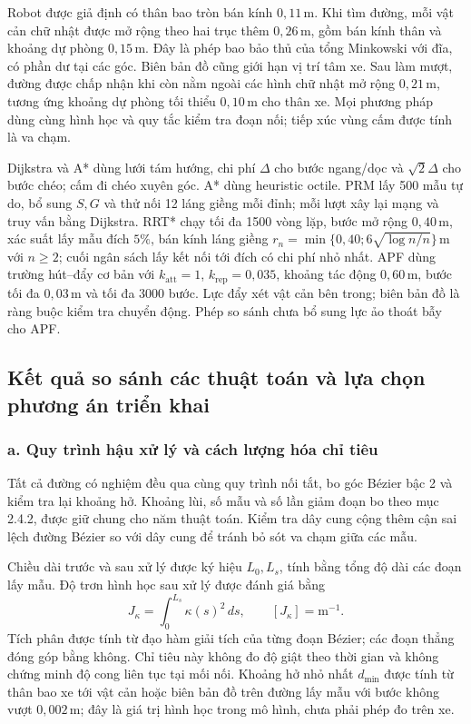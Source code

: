 \documentclass[12pt,a4paper,oneside]{report}
\begin{document}
Robot được giả định có thân bao tròn bán kính \(0{,}11\,\mathrm{m}\). Khi tìm đường, mỗi vật cản chữ nhật được mở rộng theo hai trục thêm \(0{,}26\,\mathrm{m}\), gồm bán kính thân và khoảng dự phòng \(0{,}15\,\mathrm{m}\). Đây là phép bao bảo thủ của tổng Minkowski với đĩa, có phần dư tại các góc. Biên bản đồ cũng giới hạn vị trí tâm xe. Sau làm mượt, đường được chấp nhận khi còn nằm ngoài các hình chữ nhật mở rộng \(0{,}21\,\mathrm{m}\), tương ứng khoảng dự phòng tối thiểu \(0{,}10\,\mathrm{m}\) cho thân xe. Mọi phương pháp dùng cùng hình học và quy tắc kiểm tra đoạn nối; tiếp xúc vùng cấm được tính là va chạm.

Dijkstra và A* dùng lưới tám hướng, chi phí \(\Delta\) cho bước ngang/dọc và \(\sqrt{2}\Delta\) cho bước chéo; cấm đi chéo xuyên góc. A* dùng heuristic octile. PRM lấy 500 mẫu tự do, bổ sung \(S,G\) và thử nối 12 láng giềng mỗi đỉnh; mỗi lượt xây lại mạng và truy vấn bằng Dijkstra. RRT* chạy tối đa 1500 vòng lặp, bước mở rộng \(0{,}40\,\mathrm{m}\), xác suất lấy mẫu đích \(5\%\), bán kính láng giềng \(r_n=\min\{0{,}40;6\sqrt{\log n/n}\}\,\mathrm{m}\) với \(n\geq2\); cuối ngân sách lấy kết nối tới đích có chi phí nhỏ nhất. APF dùng trường hút--đẩy cơ bản với \(k_{\mathrm{att}}=1\), \(k_{\mathrm{rep}}=0{,}035\), khoảng tác động \(0{,}60\,\mathrm{m}\), bước tối đa \(0{,}03\,\mathrm{m}\) và tối đa 3000 bước. Lực đẩy xét vật cản bên trong; biên bản đồ là ràng buộc kiểm tra chuyển động. Phép so sánh chưa bổ sung lực ảo thoát bẫy cho APF.

\subsection{Kết quả so sánh các thuật toán và lựa chọn phương án triển khai}

\subsubsection*{a. Quy trình hậu xử lý và cách lượng hóa chỉ tiêu}

Tất cả đường có nghiệm đều qua cùng quy trình nối tắt, bo góc Bézier bậc 2 và kiểm tra lại khoảng hở. Khoảng lùi, số mẫu và số lần giảm đoạn bo theo mục 2.4.2, được giữ chung cho năm thuật toán. Kiểm tra dây cung cộng thêm cận sai lệch đường Bézier so với dây cung để tránh bỏ sót va chạm giữa các mẫu.

Chiều dài trước và sau xử lý được ký hiệu \(L_0,L_s\), tính bằng tổng độ dài các đoạn lấy mẫu. Độ trơn hình học sau xử lý được đánh giá bằng
\[
  J_\kappa=\int_0^{L_s}\kappa(s)^2\,ds,
  \qquad [J_\kappa]=\mathrm{m}^{-1}.
\]
Tích phân được tính từ đạo hàm giải tích của từng đoạn Bézier; các đoạn thẳng đóng góp bằng không. Chỉ tiêu này không đo độ giật theo thời gian và không chứng minh độ cong liên tục tại mối nối. Khoảng hở nhỏ nhất \(d_{\min}\) được tính từ thân bao xe tới vật cản hoặc biên bản đồ trên đường lấy mẫu với bước không vượt \(0{,}002\,\mathrm{m}\); đây là giá trị hình học trong mô hình, chưa phải phép đo trên xe.
\end{document}
